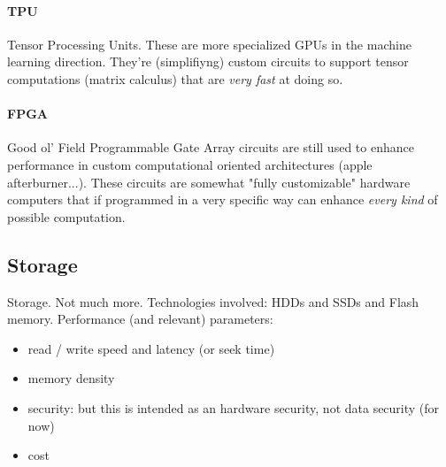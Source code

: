 \documentclass[10pt,a4paper]{article}
\begin{document}
					\paragraph{TPU}
						Tensor Processing Units. These are more specialized GPUs in the machine learning direction. They're (simplifiyng) custom circuits to support tensor computations (matrix calculus) that are \emph{very fast} at doing so. 
						
					\paragraph{FPGA}
						Good ol' Field Programmable Gate Array circuits are still used to enhance performance in custom computational oriented architectures (apple afterburner...). These circuits are somewhat "fully customizable" hardware computers that if programmed in a very specific way can enhance \emph{every kind} of possible computation. 
			
			\subsection{Storage}
				Storage. Not much more. Technologies involved: HDDs and SSDs and Flash memory. Performance (and relevant) parameters:
				\begin{itemize}
					\item read / write speed and latency (or seek time)
					\item memory density
					\item security: but this is intended as an hardware security, not data security (for now)
					\item cost
				\end{itemize}
				
\end{document}
